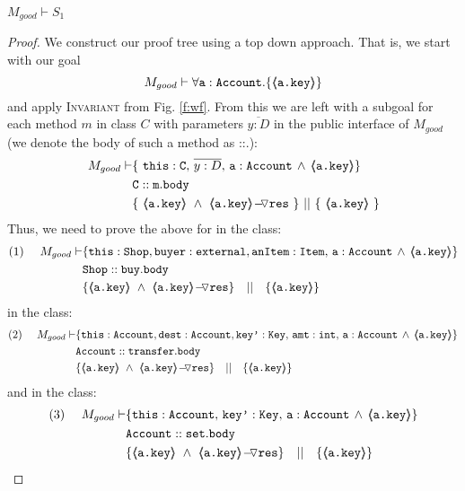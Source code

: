 \begin{lemma}
\label{lemma:exampleKeyProtect}
$M_{good} \vdash S_1$
\end{lemma}
\begin{proof}
We construct our proof tree using a top down approach.  That is, we start with our goal
$$M_{good} \vdash \forall {\mbox{\normalfont{\texttt{a}}}:\mbox{\normalfont{\texttt{Account}}}}.{{\{}}{\langle\!\!\langle \mbox{\normalfont{\texttt{\mbox{\normalfont{\texttt{a.key}}}}}} \rangle\!\!\rangle}{{\}}}$$
and apply  \textsc{Invariant} from Fig. \ref{f:wf}.
From this we are left with a subgoal for each method $m$ in  class $C$ with parameters $\overline{y:D}$ in the public interface of $M_{good}$ (we denote the body of such a method as ::.):
\small
\begin{align*}
M_{good} \vdash
		& \{ \ \prg{this}:\prg{C},\, \overline{y:D},\, \prg{a}:\prg{Account}\, \wedge\,
		   {\inside{\prg{a.key}}}\} \\
		& \prg{C}::\prg{m}.\prg{body}\ \\
		& \{\ {\inside{\prg{a.key}}}\ \wedge\ {\PushASLong {\prg{res}} {\inside{\prg{a.key}}}}\ \}\ ||\ \{\ {\inside{\prg{a.key}}} \ 			\} 
\end{align*}
\normalsize
Thus, we need to prove the above for  in the  class:
\small
\begin{align*}
\text{(1)}  \ \ \ \ M_{good} \vdash 
		&	\{  \prg{this}:\prg{Shop}, \prg{buyer} : \prg{external}, \prg{anItem} : \prg{Item},\, \prg{a}:\prg{Account}\,\wedge\, 
				{\inside{\prg{a.key}}} \} \\
		& \prg{Shop}::\prg{buy}.\prg{body}\ \\  
		& \{ {\inside{\prg{a.key}}}\ \wedge\ {\PushASLong {\prg{res}} {\inside{\prg{a.key}}}}  \} \ \ \  || \ \ \ 
		   \{ {\inside{\prg{a.key}}} \}
\end{align*}
\normalsize
{} in the  class:
\small
\begin{align*}
\text{(2)}  \ \ \ \ M_{good} \vdash 
		&	\{  \prg{this}:\prg{Account}, \prg{dest} : \prg{Account}, 
			\prg{key'} : \prg{Key},\, \prg{amt}:\prg{int},\, \prg{a}:\prg{Account}\,
			\wedge\,{\inside{\prg{a.key}}} \} \\
		& \prg{Account}::\prg{transfer}.\prg{body}\ \\  
		& \{ {\inside{\prg{a.key}}}\ \wedge\ {\PushASLong {\prg{res}} {\inside{\prg{a.key}}}}  \} \ \ \  || \ \ \ 
		   \{ {\inside{\prg{a.key}}} \}
\end{align*}
\normalsize
and  in the  class:
\small
\begin{align*}
\text{(3)}  \ \ \ \ M_{good} \vdash 
		&	\{  \prg{this}:\prg{Account},\,
			\prg{key'} : \prg{Key},\, \prg{a}:\prg{Account}\,
			\wedge\,{\inside{\prg{a.key}}} \} \\
		& \prg{Account}::\prg{set}.\prg{body}\ \\  
		& \{ {\inside{\prg{a.key}}}\ \wedge\ {\PushASLong {\prg{res}} {\inside{\prg{a.key}}}}  \} \ \ \  || \ \ \ 
		   \{ {\inside{\prg{a.key}}} \}
\end{align*}
\normalsize


\end{proof}
